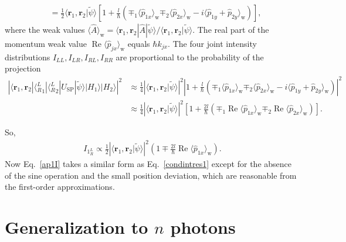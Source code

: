 \documentclass[pra,english,reprint,nofootinbib,aps,superscriptaddress,showpacs,showkeys]{revtex4-2}
\theoremstyle{definition}
\theoremstyle{remark}
\begin{document}
\begin{widetext}
\begin{align}
			&=\frac{1}{2}\langle\mathbf{r}_1,\mathbf{r}_2|\tilde{\psi}\rangle\left[1+\frac{l}{\hbar}\left(\mp_1\langle\hat{p}_{1x}\rangle_\textrm{w}\mp_2\langle\hat{p}_{2x}\rangle_\textrm{w}-i\langle \hat{p}_{1y}+\hat{p}_{2y}\rangle_\textrm{w}\right)\right],
		\end{align}
		where the weak values $\langle\hat{A}\rangle_\textrm{w}=\langle\boldsymbol{r}_1,\boldsymbol{r}_2|\hat{A}|\tilde{\psi}\rangle/\langle\boldsymbol{r}_1,\boldsymbol{r}_2|\tilde{\psi}\rangle$. The real part of the momentum weak value $\operatorname{Re}\langle\hat{p}_{jx}\rangle_\textrm{w}$ equals $\hbar k_{jx}$. The four joint intensity distributions $I_{LL},I_{LR},I_{RL},I_{RR}$ are proportional to the probability of the projection
		\begin{align}
			\left|\langle\mathbf{r}_1,\mathbf{r}_2|\langle{^L_R}_1|\langle{^L_R}_2|\hat{U}_\textrm{SP}|\tilde{\psi}\rangle|H_1\rangle|H_2\rangle\right|^2&\approx\frac{1}{4}\left|\langle\mathbf{r}_1,\mathbf{r}_2|\tilde{\psi}\rangle\right|^2\left|1+\frac{l}{\hbar}\left(\mp_1\langle\hat{p}_{1x}\rangle_\textrm{w}\mp_2\langle\hat{p}_{2x}\rangle_\textrm{w}-i\langle\hat{p}_{1y}+\hat{p}_{2y}\rangle_\textrm{w}\right)\right|^2\nonumber\\
			&\approx\frac{1}{4}\left|\langle\mathbf{r}_1,\mathbf{r}_2|\tilde{\psi}\rangle\right|^2\left[1+\frac{2l}{\hbar}\left(\mp_1\operatorname{Re}\langle\hat{p}_{1x}\rangle_\textrm{w}\mp_2\operatorname{Re}\langle\hat{p}_{2x}\rangle_\textrm{w}\right)\right].
		\end{align}

	So,
	\begin{align}\label{ap1I}
		I_{1{^L_R}}\propto\frac{1}{2}\left|\langle\mathbf{r}_1,\mathbf{r}_2|\tilde{\psi}\rangle\right|^2\left(1\mp\frac{2l}{\hbar}\operatorname{Re}\langle\hat{p}_{1x}\rangle_\textrm{w}\right).
	\end{align}
	Now Eq.~\eqref{ap1I} takes a similar form as Eq.~\eqref{condintres1} except for the absence of the sine operation and the small position deviation, which are reasonable from the first-order approximations.
	
	\section{Generalization to $n$ photons}\label{appC}
	

\end{widetext}
\end{document}
